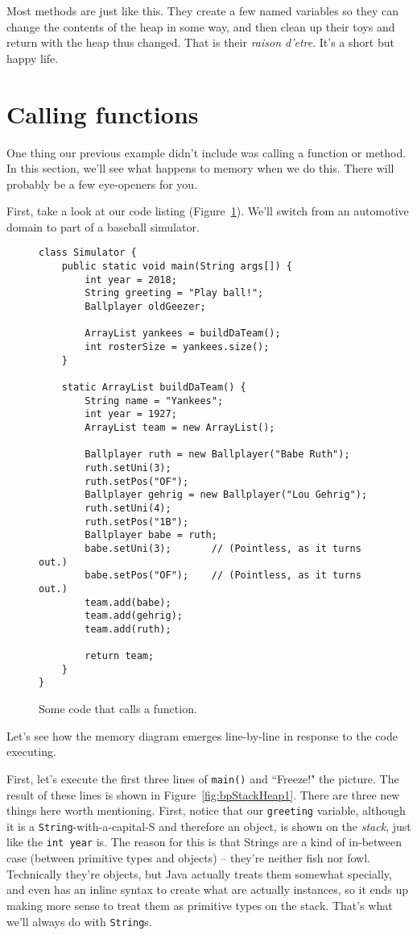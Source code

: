 Most methods are just like this. They create a few named variables so they can
change the contents of the heap in some way, and then clean up their toys
and return with the heap thus changed. That is their \textit{raison d'etre}.
It's a short but happy life.


\section{Calling functions}

One thing our previous example didn't include was calling a function or
method. In this section, we'll see what happens to memory when we do this.
There will probably be a few eye-openers for you.

First, take a look at our code listing (Figure~\ref{fig:functionCode}). We'll
switch from an automotive domain to part of a baseball simulator.

\begin{figure}[ht]
\centering
\begin{Verbatim}[fontsize=\footnotesize,samepage=true,frame=single]
class Simulator {
    public static void main(String args[]) {
        int year = 2018;
        String greeting = "Play ball!";
        Ballplayer oldGeezer;

        ArrayList yankees = buildDaTeam();
        int rosterSize = yankees.size();
    }

    static ArrayList buildDaTeam() {
        String name = "Yankees";
        int year = 1927;
        ArrayList team = new ArrayList();

        Ballplayer ruth = new Ballplayer("Babe Ruth");
        ruth.setUni(3);
        ruth.setPos("OF");
        Ballplayer gehrig = new Ballplayer("Lou Gehrig");
        ruth.setUni(4);
        ruth.setPos("1B");
        Ballplayer babe = ruth;
        babe.setUni(3);       // (Pointless, as it turns out.)
        babe.setPos("OF");    // (Pointless, as it turns out.)
        team.add(babe);
        team.add(gehrig);
        team.add(ruth);
        
        return team;
    }
}
\end{Verbatim}
\caption{Some code that calls a function.}
\label{fig:functionCode}
\end{figure}

Let's see how the memory diagram emerges line-by-line in response to the code
executing.

First, let's execute the first three lines of \texttt{main()} and ``Freeze!"
the picture. The result of these lines is shown in
Figure~\ref{fig:bpStackHeap1}. There are three new things here worth
mentioning. First, notice that our \texttt{greeting} variable, although it is
a \texttt{String}-with-a-capital-S and therefore an object, is shown on the
\textit{stack}, just like the \texttt{int year} is. The reason for this is
that Strings are a kind of in-between case (between primitive types and
objects) -- they're neither fish nor fowl. Technically they're objects, but
Java actually treats them somewhat specially, and even has an inline syntax to
create what are actually instances, so it ends up making more sense to treat
them as primitive types on the stack. That's what we'll always do with
\texttt{String}s.

